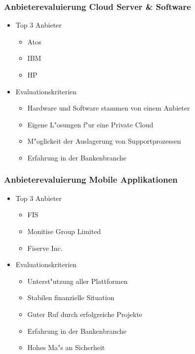 \documentclass{beamer}
\begin{document}
\begin{frame}
  \frametitle{Anbieterevaluierung Cloud Server \& Software}
  \begin{itemize}

	\item Top 3 Anbieter
		\begin{itemize}
			\item Atos
			\item IBM
			\item HP\vspace{2mm}
		\end{itemize}
	
	\item Evaluationskriterien
		\begin{itemize}
			\item Hardware und Software stammen von einem Anbieter 
			\item Eigene L"osungen f"ur eine Private Cloud
			\item M"oglickeit der Auslagerung von Supportprozessen
			\item Erfahrung in der Bankenbranche
		\end{itemize}	

  \end{itemize}
\end{frame}

\begin{frame}
  \frametitle{Anbieterevaluierung Mobile Applikationen}
  \begin{itemize}

	\item Top 3 Anbieter
		\begin{itemize}
			\item FIS
			\item Monitise Group Limited
			\item Fiserve Inc.\vspace{2mm}
		\end{itemize}

	\item Evaluationskriterien
		\begin{itemize}
			\item Unterst"utzung aller Plattformen
			\item Stabilen finanzielle Situation
			\item Guter Ruf durch erfolgreiche Projekte
			\item Erfahrung in der Bankenbranche
			\item Hohes Ma"s an Sicherheit
		\end{itemize}	
		
  \end{itemize}
\end{frame}
\end{document}
